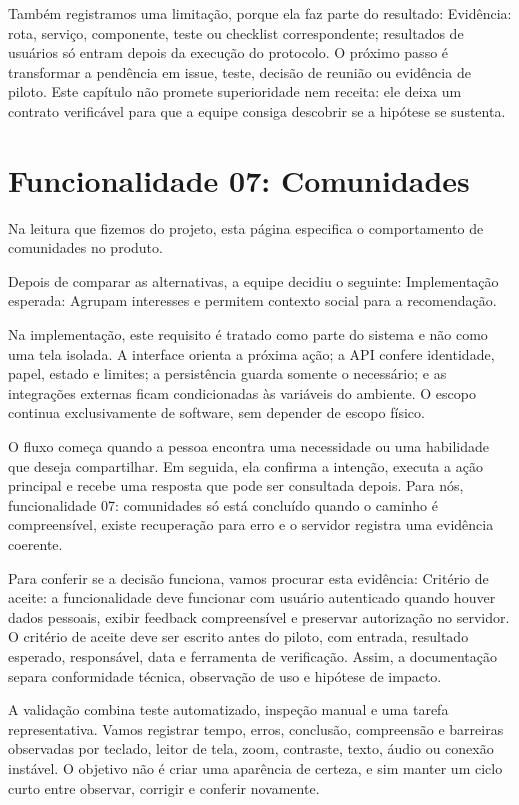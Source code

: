 \documentclass[12pt,oneside,a4paper,article]{abntex2}
\begin{document}
Também registramos uma limitação, porque ela faz parte do resultado: Evidência: rota, serviço, componente, teste ou checklist correspondente; resultados de usuários só entram depois da execução do protocolo. O próximo passo é transformar a pendência em issue, teste, decisão de reunião ou evidência de piloto. Este capítulo não promete superioridade nem receita: ele deixa um contrato verificável para que a equipe consiga descobrir se a hipótese se sustenta.

\section{Funcionalidade 07: Comunidades}
Na leitura que fizemos do projeto, esta página especifica o comportamento de comunidades no produto.

Depois de comparar as alternativas, a equipe decidiu o seguinte: Implementação esperada: Agrupam interesses e permitem contexto social para a recomendação.

Na implementação, este requisito é tratado como parte do sistema e não como uma tela isolada. A interface orienta a próxima ação; a API confere identidade, papel, estado e limites; a persistência guarda somente o necessário; e as integrações externas ficam condicionadas às variáveis do ambiente. O escopo continua exclusivamente de software, sem depender de escopo físico.

O fluxo começa quando a pessoa encontra uma necessidade ou uma habilidade que deseja compartilhar. Em seguida, ela confirma a intenção, executa a ação principal e recebe uma resposta que pode ser consultada depois. Para nós, funcionalidade 07: comunidades só está concluído quando o caminho é compreensível, existe recuperação para erro e o servidor registra uma evidência coerente.

Para conferir se a decisão funciona, vamos procurar esta evidência: Critério de aceite: a funcionalidade deve funcionar com usuário autenticado quando houver dados pessoais, exibir feedback compreensível e preservar autorização no servidor. O critério de aceite deve ser escrito antes do piloto, com entrada, resultado esperado, responsável, data e ferramenta de verificação. Assim, a documentação separa conformidade técnica, observação de uso e hipótese de impacto.

A validação combina teste automatizado, inspeção manual e uma tarefa representativa. Vamos registrar tempo, erros, conclusão, compreensão e barreiras observadas por teclado, leitor de tela, zoom, contraste, texto, áudio ou conexão instável. O objetivo não é criar uma aparência de certeza, e sim manter um ciclo curto entre observar, corrigir e conferir novamente.
\end{document}
